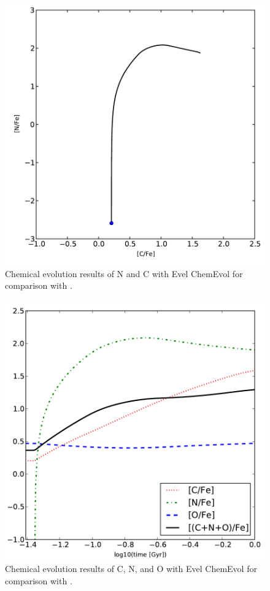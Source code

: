 \begin{figure}
 \begin{center}\includegraphics[width=1.0\columnwidth]{f9.pdf}\end{center}
 \caption{Chemical evolution results of N and C with Evel ChemEvol for comparison with \citet[][Figure 3]{Fenner:2004ju}.}
 \label{fig:fennertestnc}
\end{figure}

\begin{figure}
 \begin{center}\includegraphics[width=1.0\columnwidth]{f10.pdf}\end{center}
 \caption{Chemical evolution results of C, N, and O with Evel ChemEvol for comparison with \citet[][Figure 4]{Fenner:2004ju}.}
 \label{fig:fennertestcno}
\end{figure}
